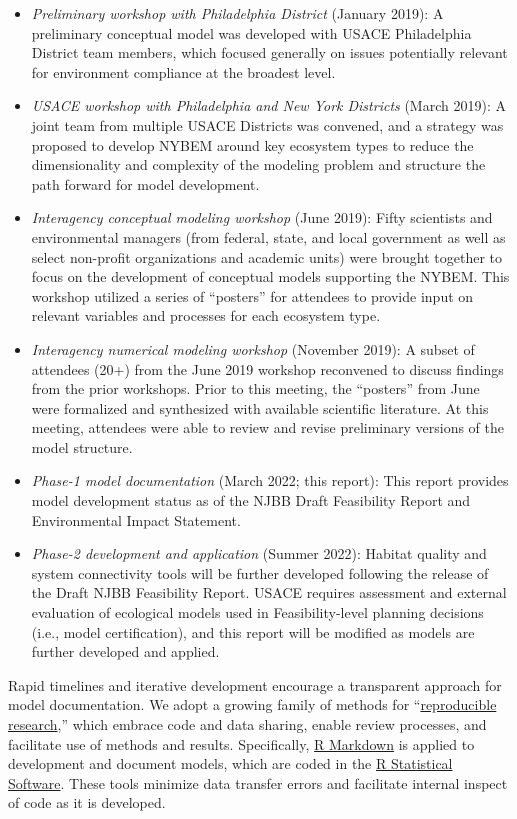 \documentclass[
]{book}
\begin{document}
\begin{itemize}
\item
  \emph{Preliminary workshop with Philadelphia District} (January 2019): A preliminary conceptual model was developed with USACE Philadelphia District team members, which focused generally on issues potentially relevant for environment compliance at the broadest level.
\item
  \emph{USACE workshop with Philadelphia and New York Districts} (March 2019): A joint team from multiple USACE Districts was convened, and a strategy was proposed to develop NYBEM around key ecosystem types to reduce the dimensionality and complexity of the modeling problem and structure the path forward for model development.
\item
  \emph{Interagency conceptual modeling workshop} (June 2019): Fifty scientists and environmental managers (from federal, state, and local government as well as select non-profit organizations and academic units) were brought together to focus on the development of conceptual models supporting the NYBEM. This workshop utilized a series of ``posters'' for attendees to provide input on relevant variables and processes for each ecosystem type.
\item
  \emph{Interagency numerical modeling workshop} (November 2019): A subset of attendees (20+) from the June 2019 workshop reconvened to discuss findings from the prior workshops. Prior to this meeting, the ``posters'' from June were formalized and synthesized with available scientific literature. At this meeting, attendees were able to review and revise preliminary versions of the model structure.
\item
  \emph{Phase-1 model documentation} (March 2022; this report): This report provides model development status as of the NJBB Draft Feasibility Report and Environmental Impact Statement.
\item
  \emph{Phase-2 development and application} (Summer 2022): Habitat quality and system connectivity tools will be further developed following the release of the Draft NJBB Feasibility Report. USACE requires assessment and external evaluation of ecological models used in Feasibility-level planning decisions (i.e., model certification), and this report will be modified as models are further developed and applied.
\end{itemize}

Rapid timelines and iterative development encourage a transparent approach for model documentation. We adopt a growing family of methods for ``\href{https://ropensci.github.io/reproducibility-guide/sections/introduction/}{reproducible research},'' which embrace code and data sharing, enable review processes, and facilitate use of methods and results. Specifically, \href{https://rmarkdown.rstudio.com/}{R Markdown} is applied to development and document models, which are coded in the \href{https://cran.r-project.org/}{R Statistical Software}. These tools minimize data transfer errors and facilitate internal inspect of code as it is developed.
\end{document}
